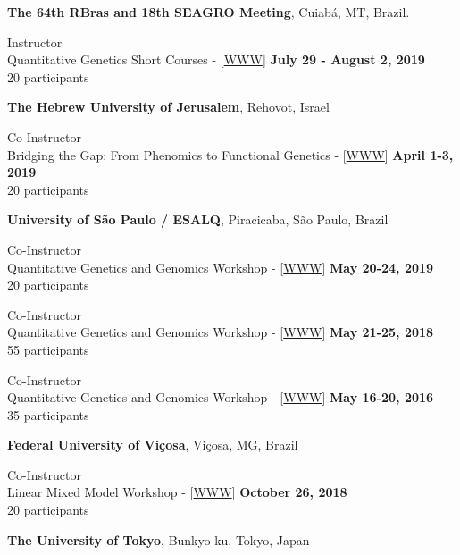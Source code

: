 \documentclass[margin,line,10pt]{res}
\begin{document}
\begin{resume}
{\bf The 64th RBras and 18th SEAGRO Meeting}, Cuiab{\'a}, MT, Brazil.
\vspace{.01pt}

Instructor  \\
    Quantitative Genetics Short Courses - [\textcolor{blue}{\href{http://morotalab.org/RBras2019/RBras2019.html}{WWW}}]
\hfill {\bf  July 29 - August 2, 2019} \\
20 participants 

    
{\bf The Hebrew University of Jerusalem}, Rehovot, Israel
\vspace{.01pt}

Co-Instructor  \\
Bridging the Gap: From Phenomics to Functional Genetics - [\textcolor{blue}{\href{http://morotalab.org/HUJI2019/HUJI2019.html}{WWW}}]
\hfill {\bf April 1-3, 2019} \\
20 participants 


{\bf University of S\~{a}o Paulo / ESALQ}, Piracicaba, S\~{a}o Paulo, Brazil
\vspace{.01pt}

Co-Instructor  \\
Quantitative Genetics and Genomics Workshop - [\textcolor{blue}{\href{http://morotalab.org/ESALQ2019/ESALQ2019.html}{WWW}}]
\hfill {\bf May 20-24, 2019} \\
20 participants 


Co-Instructor  \\
Quantitative Genetics and Genomics Workshop - [\textcolor{blue}{\href{http://morotalab.org/ESALQ2018/ESALQ2018.html}{WWW}}]
\hfill {\bf May 21-25, 2018} \\
55 participants 


Co-Instructor  \\
Quantitative Genetics and Genomics Workshop - [\textcolor{blue}{\href{http://morotalab.org/ESALQ2016/ESALQ2016.html}{WWW}}]
\hfill {\bf May 16-20, 2016} \\
35 participants  


{\bf Federal University of Vi\c cosa}, Vi\c cosa, MG, Brazil
\vspace{.01pt}

Co-Instructor  \\
Linear Mixed Model Workshop - [\textcolor{blue}{\href{http://morotalab.org/UFV2018/UFV2018.html}{WWW}}]
\hfill {\bf October 26, 2018} \\
20 participants 

{\bf The University of Tokyo}, Bunkyo-ku, Tokyo, Japan
\vspace{.01pt}


\end{resume}
\end{document}
